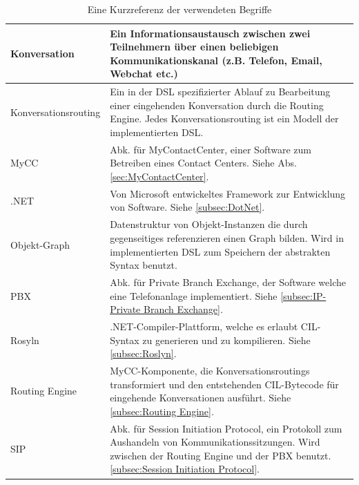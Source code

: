 \begin{table}[hbtp]
\begin{tabulary}{1.0\textwidth}{L|L}
Konversation & Ein Informationsaustausch zwischen zwei Teilnehmern über einen beliebigen Kommunikationskanal (z.B. Telefon, Email, Webchat etc.)\\

\hline

Konversationsrouting & Ein in der DSL spezifizierter Ablauf zu Bearbeitung einer eingehenden Konversation durch die Routing Engine. Jedes Konversationsrouting ist ein Modell der implementierten DSL.\\

\hline

MyCC & Abk. für MyContactCenter, einer Software zum Betreiben eines Contact Centers. Siehe Abs. \ref{sec:MyContactCenter}.\\

\hline

.NET & Von Microsoft entwickeltes Framework zur Entwicklung von Software. Siehe \ref{subsec:DotNet}.\\

\hline

Objekt-Graph & Datenstruktur von Objekt-Instanzen die durch gegenseitiges referenzieren einen Graph bilden. Wird in implementierten DSL zum Speichern der abstrakten Syntax benutzt.\\

\hline

PBX & Abk. für Private Branch Exchange, der Software welche eine Telefonanlage implementiert. Siehe \ref{subsec:IP-Private Branch Exchange}.\\

\hline

Rosyln & .NET-Compiler-Plattform, welche es erlaubt CIL-Syntax zu generieren und zu kompilieren. Siehe \ref{subsec:Roslyn}.\\

\hline

Routing Engine & MyCC-Komponente, die Konversationsroutings transformiert und den entstehenden CIL-Bytecode für eingehende Konversationen ausführt. Siehe \ref{subsec:Routing Engine}.\\

\hline
SIP & Abk. für Session Initiation Protocol, ein Protokoll zum Aushandeln von Kommunikationssitzungen. Wird zwischen der Routing Engine und der PBX benutzt. \ref{subsec:Session Initiation Protocol}.  \\

\end{tabulary}
\caption{Eine Kurzreferenz der verwendeten Begriffe}
\label{tab:kurzreferenz}
\end{table}


